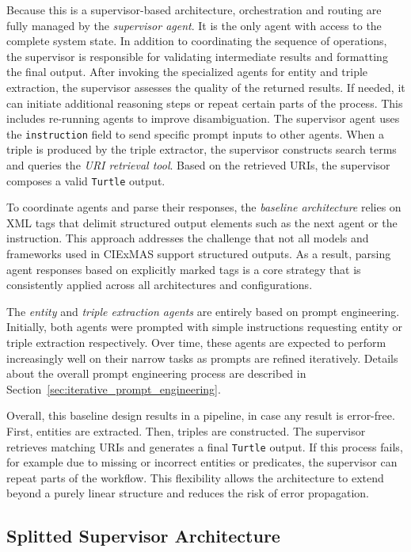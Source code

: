 \documentclass[a4paper,oneside,bibliography=totoc]{scrbook}
\begin{document}
Because this is a supervisor-based architecture, orchestration and routing are fully managed by the \textit{supervisor agent}. It is the only agent with access to the complete system state. In addition to coordinating the sequence of operations, the supervisor is responsible for validating intermediate results and formatting the final output. After invoking the specialized agents for entity and triple extraction, the supervisor assesses the quality of the returned results. If needed, it can initiate additional reasoning steps or repeat certain parts of the process. This includes re-running agents to improve disambiguation. The supervisor agent uses the \texttt{instruction} field to send specific prompt inputs to other agents. When a triple is produced by the triple extractor, the supervisor constructs search terms and queries the \textit{URI retrieval tool}. Based on the retrieved URIs, the supervisor composes a valid \texttt{Turtle} output.

To coordinate agents and parse their responses, the \textit{baseline architecture} relies on XML tags that delimit structured output elements such as the next agent or the instruction. This approach addresses the challenge that not all models and frameworks used in CIExMAS support structured outputs. As a result, parsing agent responses based on explicitly marked tags is a core strategy that is consistently applied across all architectures and configurations.

The \textit{entity} and \textit{triple extraction agents} are entirely based on prompt engineering. Initially, both agents were prompted with simple instructions requesting entity or triple extraction respectively. Over time, these agents are expected to perform increasingly well on their narrow tasks as prompts are refined iteratively. Details about the overall prompt engineering process are described in Section~\ref{sec:iterative_prompt_engineering}.

Overall, this baseline design results in a pipeline, in case any result is error-free. First, entities are extracted. Then, triples are constructed. The supervisor retrieves matching URIs and generates a final \texttt{Turtle} output. If this process fails, for example due to missing or incorrect entities or predicates, the supervisor can repeat parts of the workflow. This flexibility allows the architecture to extend beyond a purely linear structure and reduces the risk of error propagation.

\subsection{Splitted Supervisor Architecture}
\label{subsec:supervisor}
\end{document}
